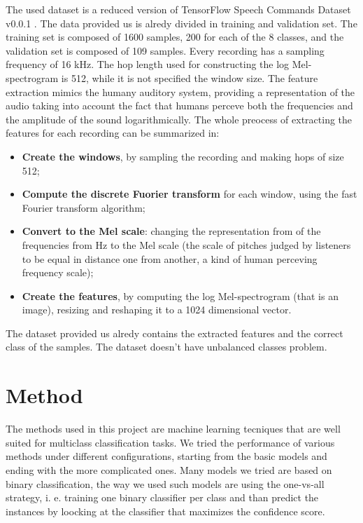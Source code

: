 \documentclass[10pt,twocolumn,letterpaper]{article}
\begin{document}
The used dataset is a reduced version of TensorFlow Speech Commands Dataset v0.0.1 \cite{tensorflow2015-whitepaper}. The data provided us is alredy divided in training and validation set. The training set is composed of 1600 samples, 200 for each of the 8 classes, and the validation set is composed of 109 samples.
Every recording has a sampling frequency of 16 kHz. The hop length used for constructing the log Mel-spectrogram is 512, while it is not specified the window size. The feature extraction mimics the humany auditory system, providing a representation of the audio taking into account the fact that humans perceve both the frequencies and the amplitude of the sound logarithmically. The whole preocess of extracting the features for each recording can be summarized in:
\begin{itemize}
	\itemsep0em 
	\item \textbf{Create the windows}, by sampling the recording and making hops of size 512;
	\item \textbf{Compute the discrete Fuorier transform} for each window, using the fast Fourier transform algorithm;
	\item \textbf{Convert to the Mel scale}: changing the representation from of the frequencies from Hz to the Mel scale (the scale of pitches judged by listeners to be equal in distance one from another, a kind of human perceving frequency scale);
	\item \textbf{Create the features}, by computing the log Mel-spectrogram (that is an image), resizing and reshaping it to a 1024 dimensional vector.
\end{itemize}
The dataset provided us alredy contains the extracted features and the correct class of the samples. The dataset doesn't have unbalanced classes problem.

\section{Method}
The methods used in this project are machine learning tecniques that are well suited for multiclass classification tasks. We tried the performance of various methods under different configurations, starting from the basic models and ending with the more complicated ones. Many models we tried are based on binary classification, the way we used such models are using the one-vs-all strategy, i. e. training one binary classifier per class and than predict the instances by loocking at the classifier that maximizes the confidence score.
\end{document}
